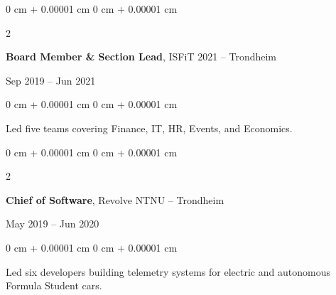 \documentclass[10pt, letterpaper]{article}
\newenvironment{onecolentry}{
    \begin{adjustwidth}{
        0 cm + 0.00001 cm
    }{
        0 cm + 0.00001 cm
    }
}{
    \end{adjustwidth}
} %
\newenvironment{twocolentry}[2][]{
    \onecolentry
    \def\secondColumn{#2}
    \setcolumnwidth{\fill, 4.5 cm}
    \begin{paracol}{2}
}{
    \switchcolumn \raggedleft \secondColumn
    \end{paracol}
    \endonecolentry
} %
\begin{document}
\vspace{0.15 cm}
\begin{twocolentry}{Sep 2019 – Jun 2021}
    \textbf{Board Member \& Section Lead}, ISFiT 2021 – Trondheim
\end{twocolentry}
\begin{onecolentry}
    Led five teams covering Finance, IT, HR, Events, and Economics.
\end{onecolentry}

\vspace{0.15 cm}
\begin{twocolentry}{May 2019 – Jun 2020}
    \textbf{Chief of Software}, Revolve NTNU – Trondheim
\end{twocolentry}
\begin{onecolentry}
    Led six developers building telemetry systems for electric and autonomous Formula Student cars.
\end{onecolentry}
\end{document}
